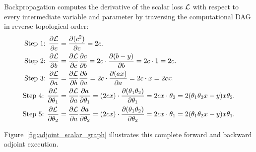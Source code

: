 \documentclass[../../main.tex]{subfiles}
\begin{document}
Backpropagation computes the derivative of the scalar loss $\mathcal{L}$ with respect to every intermediate variable and parameter by traversing the computational DAG in reverse topological order:
\begin{align}
\text{Step 1: } \frac{\partial \mathcal{L}}{\partial c} &= \frac{\partial (c^2)}{\partial c} = 2c. \label{eq:bwd_c} \\
\text{Step 2: } \frac{\partial \mathcal{L}}{\partial b} &= \frac{\partial \mathcal{L}}{\partial c} \frac{\partial c}{\partial b} = 2c \cdot \frac{\partial (b - y)}{\partial b} = 2c \cdot 1 = 2c. \label{eq:bwd_b} \\
\text{Step 3: } \frac{\partial \mathcal{L}}{\partial a} &= \frac{\partial \mathcal{L}}{\partial b} \frac{\partial b}{\partial a} = 2c \cdot \frac{\partial (a x)}{\partial a} = 2c \cdot x = 2cx. \label{eq:bwd_a} \\
\text{Step 4: } \frac{\partial \mathcal{L}}{\partial \theta_1} &= \frac{\partial \mathcal{L}}{\partial a} \frac{\partial a}{\partial \theta_1} = (2cx) \cdot \frac{\partial (\theta_1 \theta_2)}{\partial \theta_1} = 2cx \cdot \theta_2 = 2(\theta_1 \theta_2 x - y) x \theta_2. \label{eq:bwd_theta1} \\
\text{Step 5: } \frac{\partial \mathcal{L}}{\partial \theta_2} &= \frac{\partial \mathcal{L}}{\partial a} \frac{\partial a}{\partial \theta_2} = (2cx) \cdot \frac{\partial (\theta_1 \theta_2)}{\partial \theta_2} = 2cx \cdot \theta_1 = 2(\theta_1 \theta_2 x - y) x \theta_1. \label{eq:bwd_theta2}
\end{align}

Figure~\ref{fig:adjoint_scalar_graph} illustrates this complete forward and backward adjoint execution.
\end{document}
